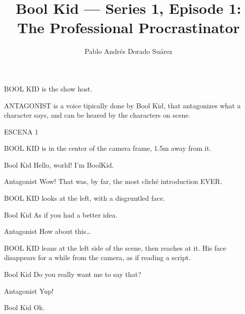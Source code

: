 \documentclass{screenplay}[2018/01/07]
\title{Bool Kid — Series 1, Episode 1: The Professional Procrastinator}
\author{Pablo Andrés Dorado Suárez}
\begin{document}
    \coverpage

    \fadein
    BOOL KID is the show host.

    ANTAGONIST is a voice tipically done by Bool Kid, that antagonizes what a
    character says, and can be heared by the characters on scene.

    \vspace{1em}
    \begin{center}
        ESCENA 1
    \end{center}
    \vspace{2em}


    BOOL KID is in the center of the camera frame, 1.5m away from it.

    \begin{dialogue}{Bool Kid}
        Hello, world! I'm BoolKid.
    \end{dialogue}

    \begin{dialogue}{Antagonist}
        Wow! That was, by far, the most cliché introduction EVER.
    \end{dialogue}

    BOOL KID looks at the left, with a disgruntled face.

    \begin{dialogue}{Bool Kid}
        As if you had a better idea.
    \end{dialogue}

    \begin{dialogue}{Antagonist}
        How about this\dots
    \end{dialogue}

    BOOL KID leans at the left side of the scene, then reaches at it. His face
    disappears for a while from the camera, as if reading a script.

    \begin{dialogue}{Bool Kid}
        Do you really want me to say that?
    \end{dialogue}

    \begin{dialogue}{Antagonist}
        Yup!
    \end{dialogue}

    \begin{dialogue}[sighing]{Bool Kid}
        Ok.
    \end{dialogue}

\end{document}
